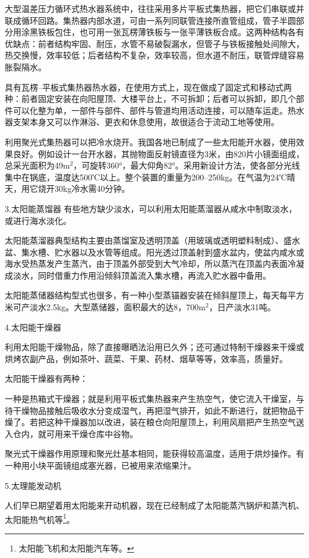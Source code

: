 \documentclass{ctexbook}
\begin{document}
大型温差压力循环式热水器系统中，往往采用多片平板式集热器，把它们串联或并联成循环回路。集热器内部水道，可由一系列同联管连接所直管组成，管子半圆部分用涂黑铁板包住，也可用一张瓦楞薄铁板与一张平薄铁板合成。这两种结构各有优缺点：前者结构牢固、耐压，水管不易破裂漏水，但管子与铁板接触处间隙大，热交换慢，效率较低；后者结构不复杂，效率较高，但水道不耐压，联管焊缝容易胀裂隔水。

具有瓦楞--平板式集热器热水器，在使用方式上，现在做成了固定式和移动式两种：前者固定安装在向阳屋顶、大楼平台上，不可拆卸；后者可以拆卸，即几个部件可以化整为单，一部件与部件、部件与管道均用活动连接，可以随车运走。热水器支架本身又可以作淋浴、更衣和休息使用，故很适合于流动工地等使用。

利用聚光式集热器可以把冷水烧开。我国各地已制成了一些太阳能开水器，使用效果良好。例如设计一台开水器，其抛物面反射镜直径为3米，由820片小镜面组成，总采光面积为49m$^{2}$，可旋转360°，最大仰角82°。采用新设计方法，使各部分光线集中在锅底，温度达500℃以上。整个装置的重量为200--250kg。在气温为24℃晴天，用它烧开30kg冷水需40分钟。

3.太阳能蒸馏器
有些地方缺少淡水，可以利用太阳能蒸溜器从咸水中制取淡水，或进行海水淡化。

太阳能蒸溜器典型结构主要由蒸馏室及透明顶盖（用玻璃或透明塑料制成）、盛水盆、集水槽、贮水器以及水管等组成。阳光透过顶盖射到盛水盆内，使盆内咸水或海水受热蒸发产生蒸汽，由于顶盖外部受到大气冷却，所以蒸汽在顶盖内表面冷凝成淡水，同时借重力作用沿倾斜顶盖流入集水槽，再流入贮水器中备用。

太阳能蒸储器结构型式也很多，有一种小型蒸锚器安装在倾斜屋顶上，每天每平方米可产淡水2.5kg。大型蒸储器，面积最大的达8，700m$^{2}$，日产淡水31吨。

4.太阳能干燥器

利用太阳能干燥物品，除了直接曝晒法沿用已久外；还可通过特制干燥器来干燥或烘烤农副产品，例如茶叶、蔬菜、干果、药材、烟草等等，效率高，质量好。

太阳能干燥器有两种：

一种是热箱式干燥器；就是利用平板式集热器来产生热空气，使它流入干燥室，与待干燥物品接触后吸收水分变成湿气，再把湿气排开，如此不断进行，就把物品干燥了。若把这种干燥器加以改进，装在粮仓向阳屋顶上，利用风扇把产生热空气送入仓内，就可用来干燥仓库中谷物。

聚光式干燥器作用原理和聚光灶基本相同，能获得较高温度，适用于烘炒操作。有一种用小块平面镜组成塞光器，已被用来浓缩果汁。

5.太理能发动机

人们早已期望着用太阳能来开动机器，现在已经制成了太阳能蒸汽锅炉和蒸汽机、太阳能热气机等\footnote{太阳能飞机和太阳能汽车等。}。
\end{document}
